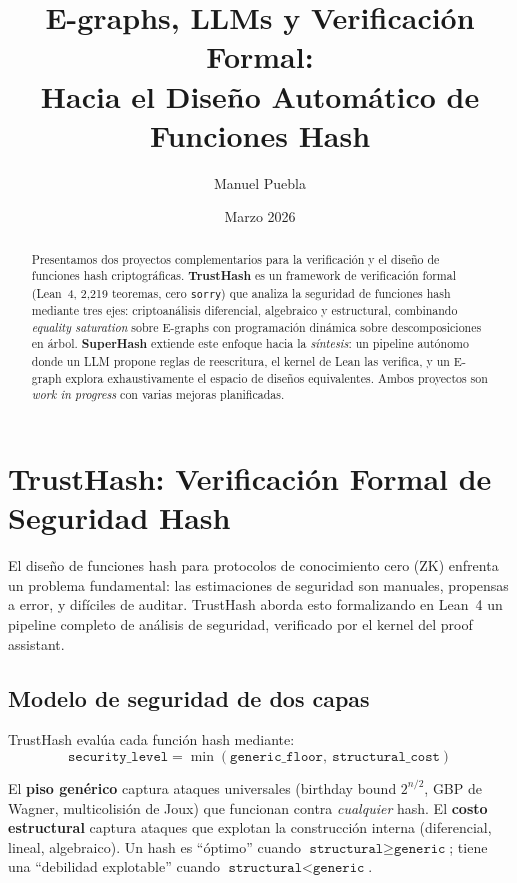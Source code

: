 \documentclass[11pt,a4paper]{article}
\title{\textbf{E-graphs, LLMs y Verificación Formal:\\Hacia el Diseño Automático de Funciones Hash}}
\author{Manuel Puebla}
\date{Marzo 2026}
\begin{document}
\maketitle

\begin{abstract}
\noindent Presentamos dos proyectos complementarios para la verificación y el diseño de funciones hash criptográficas. \textbf{TrustHash} es un framework de verificación formal (Lean~4, 2{,}219 teoremas, cero \texttt{sorry}) que analiza la seguridad de funciones hash mediante tres ejes: criptoanálisis diferencial, algebraico y estructural, combinando \emph{equality saturation} sobre E-graphs con programación dinámica sobre descomposiciones en árbol. \textbf{SuperHash} extiende este enfoque hacia la \emph{síntesis}: un pipeline autónomo donde un LLM propone reglas de reescritura, el kernel de Lean las verifica, y un E-graph explora exhaustivamente el espacio de diseños equivalentes. Ambos proyectos son \emph{work in progress} con varias mejoras planificadas.
\end{abstract}

\section{TrustHash: Verificación Formal de Seguridad Hash}

El diseño de funciones hash para protocolos de conocimiento cero (ZK) enfrenta un problema fundamental: las estimaciones de seguridad son manuales, propensas a error, y difíciles de auditar. TrustHash aborda esto formalizando en Lean~4 un pipeline completo de análisis de seguridad, verificado por el kernel del proof assistant.

\subsection{Modelo de seguridad de dos capas}

TrustHash evalúa cada función hash mediante:
\[
\texttt{security\_level} = \min(\texttt{generic\_floor},\ \texttt{structural\_cost})
\]

El \textbf{piso genérico} captura ataques universales (birthday bound $2^{n/2}$, GBP de Wagner, multicolisión de Joux) que funcionan contra \emph{cualquier} hash. El \textbf{costo estructural} captura ataques que explotan la construcción interna (diferencial, lineal, algebraico). Un hash es ``óptimo'' cuando $\texttt{structural} \geq \texttt{generic}$; tiene una ``debilidad explotable'' cuando $\texttt{structural} < \texttt{generic}$.
\end{document}
